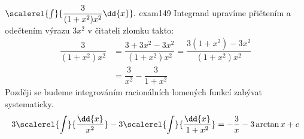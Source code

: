 \begin{mathexam}{\(\scalerel{\int}{\dfrac{3}{(1+x^2)x^2}\dd{x}}.\)
  \hfill\cite[s.~29]{Knichal}}{exam149} 
  Integrand upravíme přičtením a odečtením výrazu \(3x^2\) v čitateli zlomku takto:
  \begin{align*}
    \dfrac{3}{(1+x^2)x^2} 
      &= \dfrac{3+3x^2-3x^2}{(1+x^2)x^2} = \dfrac{3(1+x^2)-3x^2}{(1+x^2)x^2}      \\
      &= \dfrac{3}{x^2} - \dfrac{3}{1+x^2}
  \end{align*}
  Později se budeme integrováním racionálních lomených funkcí zabývat systematicky.
  \[3\scalerel{\int}{\dfrac{\dd{x}}{x^2}} - 3\scalerel{\int}{\dfrac{\dd{x}}{1+x^2}}= -\dfrac{3}{x} -
    3\arctan x + c\]
\end{mathexam}